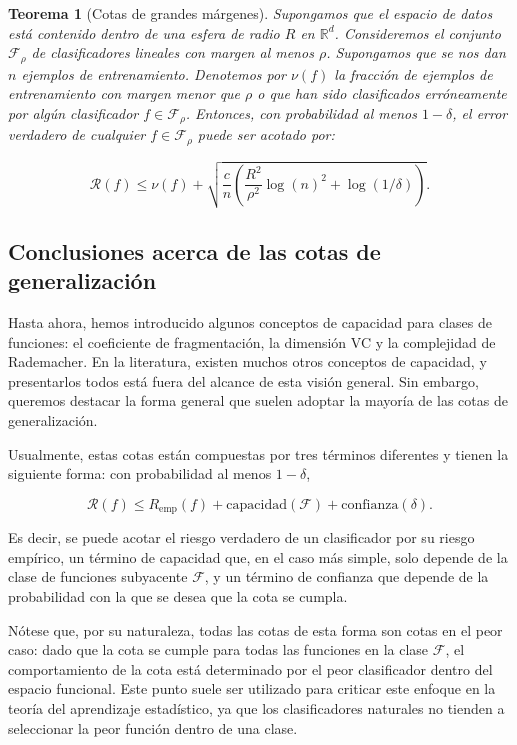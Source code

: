 \documentclass{report}
\newtheorem{thm}{Teorema}[section]
\begin{document}
\begin{thm}[Cotas de grandes márgenes]

Supongamos que el espacio de datos está contenido dentro de una esfera de radio \(R\) en 
\(\mathbb{R}^d\). Consideremos el conjunto \(\mathcal{F}_\rho\) de clasificadores lineales con 
margen al menos \(\rho\). Supongamos que se nos dan \(n\) ejemplos de entrenamiento. Denotemos 
por \(\nu(f)\) la fracción de ejemplos de entrenamiento con margen menor que \(\rho\) o que han 
sido clasificados erróneamente por algún clasificador \(f \in \mathcal{F}_\rho\). Entonces, con 
probabilidad al menos \(1 - \delta\), el error verdadero de cualquier \(f \in \mathcal{F}_\rho\) 
puede ser acotado por:

\[
\mathcal{R}(f) \leq \nu(f) + \sqrt{\frac{c}{n} \left( \frac{R^2}{\rho^2} \log(n)^2 + \log(1/\delta) \right)} .
\]
\end{thm}

\subsection{Conclusiones acerca de las cotas de generalización}

Hasta ahora, hemos introducido algunos conceptos de capacidad para clases de funciones: el 
coeficiente de fragmentación, la dimensión VC y la complejidad de Rademacher. En la literatura, 
existen muchos otros conceptos de capacidad, y presentarlos todos está fuera del alcance de esta 
visión general. Sin embargo, queremos destacar la forma general que suelen adoptar la mayoría 
de las cotas de generalización.\newline

Usualmente, estas cotas están compuestas por tres términos diferentes y tienen la siguiente forma: 
con probabilidad al menos \(1 - \delta\),

\[
\mathcal{R}(f) \leq R_{\text{emp}}(f) + \text{capacidad}(\mathcal{F}) + \text{confianza}(\delta).
\]

Es decir, se puede acotar el riesgo verdadero de un clasificador por su riesgo empírico, un término 
de capacidad que, en el caso más simple, solo depende de la clase de funciones subyacente 
\(\mathcal{F}\), y un término de confianza que depende de la probabilidad con la que se desea que 
la cota se cumpla.\newline

Nótese que, por su naturaleza, todas las cotas de esta forma son cotas en el peor caso: dado que 
la cota se cumple para todas las funciones en la clase \(\mathcal{F}\), el comportamiento de la cota 
está determinado por el peor clasificador dentro del espacio funcional. Este punto suele ser 
utilizado para criticar este enfoque en la teoría del aprendizaje estadístico, ya que los clasificadores 
naturales no tienden a seleccionar la peor función dentro de una clase.\newline
\end{document}

